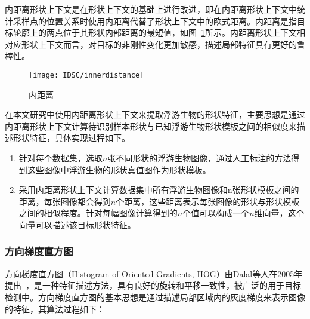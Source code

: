 内距离形状上下文是在形状上下文的基础上进行改进，即在内距离形状上下文中统计采样点的位置关系时使用内距离代替了形状上下文中的欧式距离。内距离是指目标轮廓上的两点位于其形状内部距离的最短值，如图~\ref{fig:innerdistance}所示。内距离形状上下文相对应形状上下文而言，对目标的非刚性变化更加敏感，描述局部特征具有更好的鲁棒性。
\begin{figure}[H] %
  \centering
  \texttt{[image: IDSC/innerdistance]}
  \caption{内距离}
  \label{fig:innerdistance}
\end{figure}

在本文研究中使用内距离形状上下文来提取浮游生物的形状特征，主要思想是通过内距离形状上下文计算待识别样本形状与已知浮游生物形状模板之间的相似度来描述形状特征，具体实现过程如下。

\begin{enumerate}
\item 针对每个数据集，选取$n$张不同形状的浮游生物图像，通过人工标注的方法得到这些图像中浮游生物的形状真值图作为形状模板。
\item 采用内距离形状上下文计算数据集中所有浮游生物图像和n张形状模板之间的距离，每张图像都会得到$n$个距离，这些距离表示每张图像的形状与形状模板之间的相似程度。针对每幅图像计算得到的$n$个值可以构成一个$n$维向量，这个向量可以描述该目标形状特征。
\end{enumerate}


\subsubsection{方向梯度直方图}

方向梯度直方图（Histogram of Oriented Gradients, HOG）由Dalal等人在2005年提出~\cite{dalal2005histograms}，是一种特征描述方法，具有良好的旋转和平移一致性，被广泛的用于目标检测中。方向梯度直方图的基本思想是通过描述局部区域内的灰度梯度来表示图像的特征，其算法过程如下：

